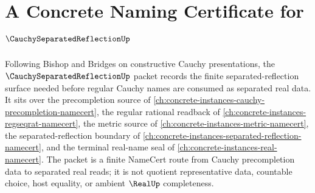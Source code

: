 \chapter{A Concrete Naming Certificate for $\CauchySeparatedReflectionUp$}
\label{ch:concrete-instances-cauchy-separated-reflection-namecert}

Following Bishop and Bridges on constructive Cauchy presentations, the $\CauchySeparatedReflectionUp$ packet records the finite separated-reflection surface needed before regular Cauchy names are consumed as separated real data. It sits over the precompletion source of \autoref{ch:concrete-instances-cauchy-precompletion-namecert}, the regular rational readback of \autoref{ch:concrete-instances-regseqrat-namecert}, the metric source of \autoref{ch:concrete-instances-metric-namecert}, the separated-reflection boundary of \autoref{ch:concrete-instances-separated-reflection-namecert}, and the terminal real-name seal of \autoref{ch:concrete-instances-real-namecert}. The packet is a finite NameCert route from Cauchy precompletion data to separated real reads; it is not quotient representative data, countable choice, host equality, or ambient $\RealUp$ completeness.

